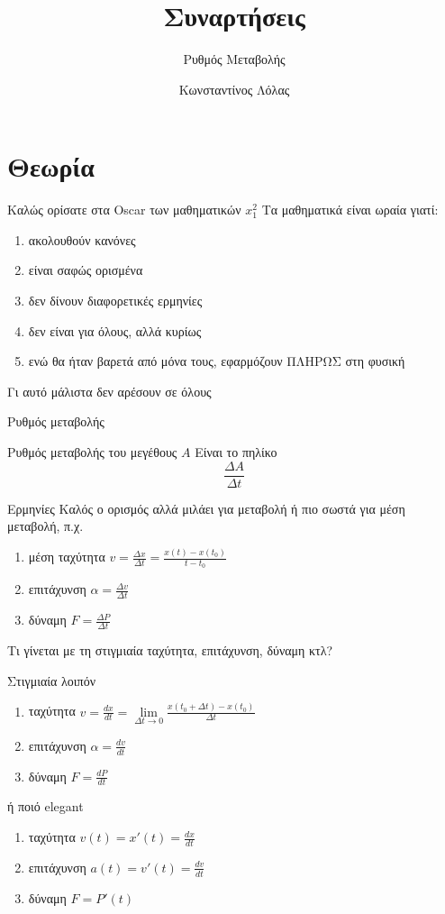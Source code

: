 \documentclass[greek]{beamer}
\title{Συναρτήσεις}
\subtitle{Ρυθμός Μεταβολής}
\author[Λόλας]{Κωνσταντίνος Λόλας}
\date{}
\begin{document}
\begin{frame}
  \titlepage
\end{frame}

\section{Θεωρία}
\begin{frame}{Καλώς ορίσατε στα Oscar των μαθηματικών}
  $x_1^2$
  Τα μαθηματικά είναι ωραία γιατί:
  \begin{enumerate}
    \item<1-> ακολουθούν κανόνες
    \item<2-> είναι σαφώς ορισμένα
    \item<3-> δεν δίνουν διαφορετικές ερμηνίες
    \item<4-> δεν είναι για όλους, αλλά κυρίως
    \item<5-> ενώ θα ήταν βαρετά από μόνα τους, εφαρμόζουν ΠΛΗΡΩΣ στη φυσική
  \end{enumerate}
   Γι αυτό μάλιστα δεν αρέσουν σε όλους
\end{frame}

\begin{frame}{Ρυθμός μεταβολής}
  \begin{block}{Ρυθμός μεταβολής του μεγέθους $A$}
    Είναι το πηλίκο
    $$\frac{ΔA}{Δt}$$
  \end{block}
\end{frame}

\begin{frame}{Ερμηνίες}
  Καλός ο ορισμός αλλά μιλάει για μεταβολή ή πιο σωστά για μέση μεταβολή, π.χ.
  \begin{enumerate}
    \item<1-> μέση ταχύτητα $v=\frac{Δx}{Δt}=\frac{x(t)-x(t_0)}{t-t_0}$
    \item<2-> επιτάχυνση $α=\frac{Δv}{Δt}$
    \item<3-> δύναμη $F=\frac{ΔP}{Δt}$
  \end{enumerate}
   Τι γίνεται με τη στιγμιαία ταχύτητα, επιτάχυνση, δύναμη κτλ?
\end{frame}

\begin{frame}{Στιγμιαία λοιπόν}
  \begin{enumerate}
    \item<1-> ταχύτητα $v=\frac{dx}{dt}=\lim\limits_{Δt \to 0}{ \frac{x(t_0+Δt) - x(t_0)}{Δt} }$
    \item<2-> επιτάχυνση $α=\frac{dv}{dt}$
    \item<3-> δύναμη $F=\frac{dP}{dt}$
  \end{enumerate}
   ή ποιό elegant
  \begin{enumerate}
    \item<5-> ταχύτητα $v(t)=x'(t)=\frac{dx}{dt}$
    \item<6-> επιτάχυνση $a(t)=v'(t)=\frac{dv}{dt}$
    \item<7-> δύναμη $F=P'(t)$
  \end{enumerate}
\end{frame}
\end{document}
